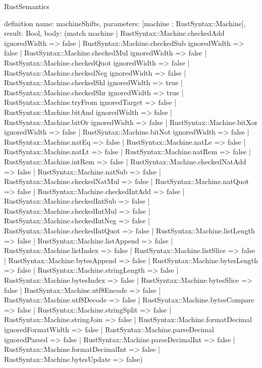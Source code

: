 \begin{lexlean}{RustSemantics}
\begin{semanticmodule}
definition{
  name: machineShifts,
  parameters: [machine : RustSyntax::Machine],
  result: Bool,
  body: (match machine
    | RustSyntax::Machine.checkedAdd ignoredWidth => false
    | RustSyntax::Machine.checkedSub ignoredWidth => false
    | RustSyntax::Machine.checkedMul ignoredWidth => false
    | RustSyntax::Machine.checkedQuot ignoredWidth => false
    | RustSyntax::Machine.checkedNeg ignoredWidth => false
    | RustSyntax::Machine.checkedShl ignoredWidth => true
    | RustSyntax::Machine.checkedShr ignoredWidth => true
    | RustSyntax::Machine.tryFrom ignoredTarget => false
    | RustSyntax::Machine.bitAnd ignoredWidth => false
    | RustSyntax::Machine.bitOr ignoredWidth => false
    | RustSyntax::Machine.bitXor ignoredWidth => false
    | RustSyntax::Machine.bitNot ignoredWidth => false
    | RustSyntax::Machine.natEq => false
    | RustSyntax::Machine.natLe => false
    | RustSyntax::Machine.natLt => false
    | RustSyntax::Machine.natRem => false
    | RustSyntax::Machine.intRem => false
    | RustSyntax::Machine.checkedNatAdd => false
    | RustSyntax::Machine.natSub => false
    | RustSyntax::Machine.checkedNatMul => false
    | RustSyntax::Machine.natQuot => false
    | RustSyntax::Machine.checkedIntAdd => false
    | RustSyntax::Machine.checkedIntSub => false
    | RustSyntax::Machine.checkedIntMul => false
    | RustSyntax::Machine.checkedIntNeg => false
    | RustSyntax::Machine.checkedIntQuot => false
    | RustSyntax::Machine.listLength => false
    | RustSyntax::Machine.listAppend => false
    | RustSyntax::Machine.listIndex => false
    | RustSyntax::Machine.listSlice => false
    | RustSyntax::Machine.bytesAppend => false
    | RustSyntax::Machine.bytesLength => false
    | RustSyntax::Machine.stringLength => false
    | RustSyntax::Machine.bytesIndex => false
    | RustSyntax::Machine.bytesSlice => false
    | RustSyntax::Machine.utf8Encode => false
    | RustSyntax::Machine.utf8Decode => false
    | RustSyntax::Machine.bytesCompare => false
    | RustSyntax::Machine.stringSplit => false
    | RustSyntax::Machine.stringJoin => false
    | RustSyntax::Machine.formatDecimal ignoredFormatWidth => false
    | RustSyntax::Machine.parseDecimal ignoredParsed => false
    | RustSyntax::Machine.parseDecimalInt => false
    | RustSyntax::Machine.formatDecimalInt => false
    | RustSyntax::Machine.bytesUpdate => false)
}


\end{semanticmodule}
\end{lexlean}
